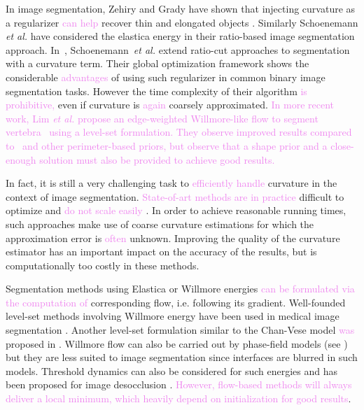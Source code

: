 \documentclass[runningheads]{llncs}
\newcommand{\HT}[1]{{\textcolor{violet}{#1}}}
\begin{document}
In image segmentation, Zehiry and Grady have shown that injecting curvature as a regularizer \HT{can help} recover thin
and elongated objects \cite{zehiry10fast}. Similarly Schoenemann {\em et al.}  \cite{schoenemann09linear} have
considered the elastica energy in their ratio-based image segmentation approach. In~\cite{schoenemann2011elastic},
Schoenemann~{\em et al.} extend ratio-cut approaches to segmentation with a curvature term. Their global optimization
framework shows the considerable \HT{advantages} of using such regularizer in common binary image segmentation tasks.
However the time complexity of their algorithm \HT{is prohibitive,} even if curvature is \HT{again} coarsely
approximated.  \HT{In more recent work, Lim {\em et al.} propose an edge-weighted Willmore-like flow to segment
vertebra~\cite{lim2012introducing} using a level-set formulation. They observe improved results compared
to~\cite{casseles97geodesic} and other perimeter-based priors, but observe that a shape prior and a close-enough
solution must also be provided to achieve good results.}

In fact, it is still a very challenging task to \HT{efficiently handle} curvature in the context of image segmentation.
\HT{State-of-art methods are in practice} difficult to optimize and \HT{do not scale easily}
\cite{zehiry10fast,schoenemann09linear,strandmark11globalframework,nieuwenhuis14efficient}. In order to achieve
reasonable running times, such approaches make use of coarse curvature estimations for which the approximation error is
\HT{often} unknown. Improving the quality of the curvature estimator has an important impact on the accuracy of the
results, but is computationally too costly in these methods.

Segmentation methods using Elastica or Willmore energies \HT{can be formulated via the computation of} corresponding
flow, i.e. following its gradient. Well-founded level-set methods involving Willmore energy \cite{droske2004level} have
been used in medical image segmentation \cite{lim2012introducing}. Another level-set formulation similar to the
Chan-Vese model \HT{was} proposed in \cite{zhu2013image}. Willmore flow can also be carried out by phase-field models
(see \cite{bretin2015phase}) but they are less suited to image segmentation since interfaces are blurred in such
models. Threshold dynamics can also be considered for such energies \cite{esedoglu2008threshold} and has been proposed
for image desocclusion \cite{esedoglu2005threshold}. \HT{However, flow-based methods will always deliver
  a local minimum, which heavily depend on initialization for good results}.
\end{document}

